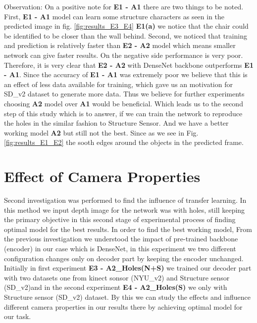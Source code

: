 Observation: On a positive note for \textbf{E1 - A1} there are two things to be noted. First,  \textbf{E1 - A1} model can learn some structure characters as seen in the predicted image in fig. \ref{fig:results_E3_E4} \textbf{E1(a)} we notice that the chair could be identified to be closer than the wall behind. Second, we noticed that training and prediction is relatively  faster than \textbf{E2 - A2} model which means smaller network can give faster results. On the negative  side performance is very poor. 
Therefore, it is very clear that \textbf{E2 - A2} with DenseNet backbone outperforms \textbf{E1 - A1}. Since the accuracy of \textbf{E1 - A1} was extremely poor we believe that this is an effect of less data available for training, which gave us an motivation for SD\_v2  dataset to generate more data. Thus we believe for further experiments choosing \textbf{A2} model over \textbf{A1} would be beneficial. Which leads us to the second step of this study which is to answer, if we can train the network to reproduce the holes in the similar fashion to Structure Sensor. And we have a better working model \textbf{A2} but still not the best. Since as we see in Fig. \ref{fig:results_E1_E2} the sooth edges around the objects in the predicted frame. 
 


 

 \section{Effect of Camera Properties}
 \label{Chapter6:Transfer_Learning}
Second investigation was performed to find the influence of transfer learning. In this method we input depth image for the network was with holes, still keeping the primary objective in this second stage of experimental process of finding optimal model for the best results. In order to find the best working model, From the previous investigation we understood the impact of pre-trained backbone (encoder) in our case which is DenseNet, in this experiment we two different configuration changes only on decoder part by keeping the encoder unchanged. Initially in first experiment \textbf{E3 - A2\_Holes(N+S)}  we trained our decoder part with two datasets one from kinect sonsor (NYU\_v2) and Structure sensor (SD\_v2)and in the second experiment \textbf{E4 - A2\_Holes(S)} we only with Structure sensor (SD\_v2) dataset. By this we can study the effects and influence different camera properties in our results there by achieving optimal model for our task.

